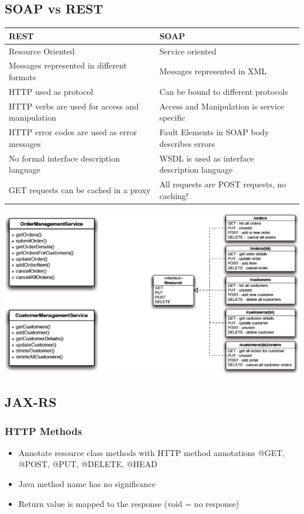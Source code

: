 \documentclass[10pt]{article}
\begin{document}
\subsection{SOAP vs REST}
\begin{tabular}{l | l}
	\textbf{REST} & \textbf{SOAP} \\
	\hline
	Resource Oriented & Service oriented \\
	Messages represented in different formats & Messages represented in XML \\
	HTTP used as protocol & Can be bound to different protocols \\
	HTTP verbs are used for access and manipulation & Access and Manipulation is service specific \\
	HTTP error codes are used as error messages & Fault Elements in SOAP body describes errors \\
	No formal interface description language & WSDL is used as interface description language \\
	GET requests can be cached in a proxy & All requests are POST requests, no caching!
\end{tabular}
\begin{center}
	\includegraphics[scale=0.5]{images/soap-rest.png}
\end{center}

\subsection{JAX-RS}
\subsubsection{HTTP Methods}
\begin{itemize}
	\item Annotate resource class methods with HTTP method annotations @GET, @POST, @PUT, @DELETE, @HEAD
	\item Java method name has no significance
	\item Return value is mapped to the response (void = no response)
\end{itemize}
\end{document}
